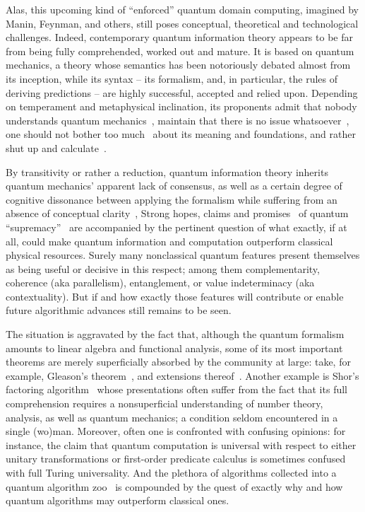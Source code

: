 \documentclass[runningheads]{llncs}
\begin{document}
Alas, this upcoming kind of ``enforced'' quantum domain computing, imagined by Manin, Feynman, and others, still poses conceptual, theoretical and technological challenges.
Indeed, contemporary quantum information theory appears to be far from being fully comprehended, worked out and mature.
It is based on quantum mechanics, a theory whose semantics has been notoriously debated almost from its inception, while its syntax -- its formalism, and, in particular,
the rules of deriving predictions
-- are highly successful, accepted and relied upon.
Depending on temperament and metaphysical inclination, its proponents admit that nobody understands quantum mechanics~\cite{feynman-law,clauser-talkvie},
maintain that there is no issue whatsoever~\cite{Englert2013,fuchs-peres},
one should not bother too much~\cite{dirac,bell-a} about its meaning and foundations, and rather shut up and calculate~\cite{mermin-1989-shutup,mermin-2004-shutup}.

By transitivity or rather a reduction, quantum information theory inherits quantum mechanics'
apparent lack of consensus, as well as a certain degree of cognitive dissonance between applying the formalism while suffering from an absence of conceptual clarity~\cite{mermin-2019},
Strong hopes, claims and promises~\cite{Aaronson:2013:QCD:2487754,Dyakonov-2013,svozil-2016-quantum-hokus-pokus,Abbott-Calude-blog-2016-06-19,Dyakonov-2019,aaronson-Dyakonov} of quantum ``supremacy''~\cite{Wiesner-2017} are
accompanied by the pertinent question of what exactly, if at all, could make quantum information and computation outperform classical physical resources.
Surely many nonclassical quantum features present themselves as being useful or decisive in this respect; among them complementarity, coherence (aka parallelism), entanglement,
or value indeterminacy (aka contextuality).
But if and how exactly those features will contribute or enable future algorithmic advances still remains to be seen.

The situation is aggravated by the fact that, although the quantum formalism amounts to linear algebra and functional analysis,
some of its most important theorems are merely superficially absorbed by the community at large: take,
for example, Gleason's theorem~\cite{Gleason}, and extensions thereof~\cite{pitowsky:218,2015-AnalyticKS}.
Another example is Shor's factoring algorithm~\cite[Chapter~5]{nielsen-book10} whose presentations often suffer from the fact
that its full comprehension requires a nonsuperficial understanding of number theory,
analysis, as well as quantum mechanics; a condition seldom encountered in a single (wo)man.
Moreover, often one is confronted with confusing opinions: for instance, the claim that quantum computation is universal with respect to either unitary transformations
or first-order predicate calculus is sometimes confused with full Turing universality.
And the plethora of algorithms collected into a quantum algorithm zoo~\cite{jordan-zoo} is compounded by the quest of exactly why and how quantum algorithms may outperform classical ones.
\end{document}
